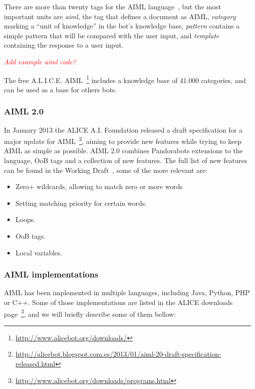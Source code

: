 There are more than twenty tags for the AIML language~\cite{aliceaiml}, but the most important units are \emph{aiml}, the tag that defines a document as \ac{AIML}, \emph{category} marking a ``unit of knowledge'' in the bot's knowledge base, \emph{pattern} contains a simple pattern that will be compared with the user input, and \emph{template} containing the response to a user input.

\emph{\textcolor{red}{Add example aiml code?}}

The free A.L.I.C.E. \ac{AIML}~\footnote{\url{http://www.alicebot.org/downloads/}} includes a knowledge base of 41.000 categories, and can be used as a base for others bots.

\subsubsection{\ac{AIML} 2.0}

In January 2013 the ALICE A.I. Foundation released a draft specification for a major update for \ac{AIML}~\footnote{\url{http://alicebot.blogspot.com.es/2013/01/aiml-20-draft-specification-released.html}}, aiming to provide new features while trying to keep \ac{AIML} as simple as possible. \ac{AIML} 2.0 combines Pandorabots extensions to the language, \ac{OoB} tags and a collection of new features. The full list of new features can be found in the Working Draft~\cite{aiml20draft}, some of the more relevant are:

\begin{itemize}[topsep=0pt,itemsep=-1ex,partopsep=1ex,parsep=1ex]
  \item Zero+ wildcards, allowing to match zero or more words
  \item Setting matching priority for certain words.
  \item Loops.
  \item \ac{OoB} tags.
  \item Local variables.
\end{itemize}

\subsubsection{\ac{AIML} implementations}

\ac{AIML} has been implemented in multiple languages, including Java, Python, PHP or C++. Some of those implementations are listed in the ALICE downloads page~\footnote{\url{http://www.alicebot.org/downloads/programs.html}}, and we will briefly describe some of them bellow:

